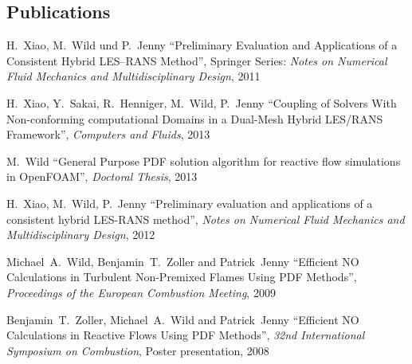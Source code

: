 \documentclass[line,11pt,a4paper]{../resume}
\begin{document}
\begin{resume}
\pagebreak
\section{\mysidestyle Publications}\vspace{2mm}
H.~Xiao, M.~Wild und P.~Jenny ``Preliminary Evaluation and
Applications of a Consistent Hybrid LES--RANS Method'', Springer Series:
\textsl{Notes on Numerical Fluid Mechanics and Multidisciplinary Design}, 2011

\vspace{-2mm}
H.~Xiao, Y.~Sakai, R.~Henniger, M.~Wild, P.~Jenny
``Coupling of Solvers With Non-conforming computational Domains in a Dual-Mesh
Hybrid LES/RANS Framework'', \textsl{Computers and Fluids}, 2013

M.~Wild
``General Purpose PDF solution algorithm for reactive flow simulations in
OpenFOAM'', \textsl{Doctoral Thesis}, 2013

\vspace{-2mm}
H.~Xiao, M.~Wild, P.~Jenny
``Preliminary evaluation and applications of a consistent hybrid LES-RANS
method'', \textsl{Notes on Numerical Fluid Mechanics and Multidisciplinary
Design}, 2012

\vspace{-2mm}
Michael~A.~Wild, Benjamin~T.~Zoller and Patrick~Jenny
``Efficient $\mathrm{NO}$ Calculations in Turbulent Non-Premixed Flames Using
PDF Methods'', \textsl{Proceedings of the European Combustion Meeting}, 2009

\vspace{-2mm}
Benjamin~T.~Zoller, Michael~A.~Wild and Patrick~Jenny
``Efficient $\mathrm{NO}$ Calculations in Reactive Flows Using PDF Methods'',
\textsl{32nd International Symposium on Combustion}, Poster presentation, 2008



\end{resume}
\end{document}
